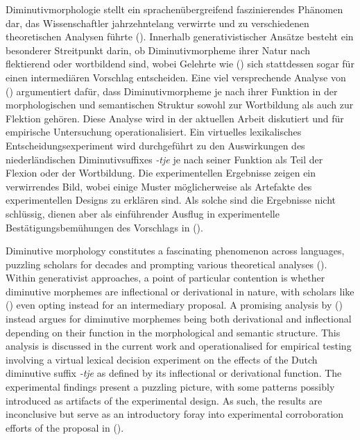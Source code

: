 \begin{abstractDE}
Diminutivmorphologie stellt ein sprachenübergreifend faszinierendes Phänomen dar, das Wissenschaftler jahrzehntelang verwirrte und zu verschiedenen theoretischen Analysen führte (\cite{Schneider+2003}). Innerhalb generativistischer Ansätze besteht ein besonderer Streitpunkt darin, ob Diminutivmorpheme ihrer Natur nach flektierend oder wortbildend sind, wobei Gelehrte wie \citeauthor{Scalise+1986} (\citeyear{Scalise+1986}) sich stattdessen sogar für einen intermediären Vorschlag entscheiden. Eine viel versprechende Analyse von \citeauthor{DeBelder+etal+2014} (\citeyear{DeBelder+etal+2014}) argumentiert dafür, dass Diminutivmorpheme je nach ihrer Funktion in der morphologischen und semantischen Struktur sowohl zur Wortbildung als auch zur Flektion gehören. Diese Analyse wird in der aktuellen Arbeit diskutiert und für empirische Untersuchung operationalisiert. Ein virtuelles lexikalisches Entscheidungsexperiment wird durchgeführt zu den Auswirkungen des niederländischen Diminutivsuffixes \textit{-tje} je nach seiner Funktion als Teil der Flexion oder der Wortbildung. Die experimentellen Ergebnisse zeigen ein verwirrendes Bild, wobei einige Muster möglicherweise als Artefakte des experimentellen Designs zu erklären sind. Als solche sind die Ergebnisse nicht schlüssig, dienen aber als einführender Ausflug in experimentelle Bestätigungsbemühungen des Vorschlags in \citeauthor{DeBelder+etal+2014} (\citeyear{DeBelder+etal+2014}).
\end{abstractDE}

\vfill

\begin{abstractEN}
Diminutive morphology constitutes a fascinating phenomenon across languages, puzzling scholars for decades and prompting various theoretical analyses (\cite{Schneider+2003}). Within generativist approaches, a point of particular contention is whether diminutive morphemes are inflectional or derivational in nature, with scholars like \citeauthor{Scalise+1986} (\citeyear{Scalise+1986}) even opting instead for an intermediary proposal. A promising analysis by \citeauthor{DeBelder+etal+2014} (\citeyear{DeBelder+etal+2014}) instead argues for diminutive morphemes being both derivational and inflectional depending on their function in the morphological and semantic structure. This analysis is discussed in the current work and operationalised for empirical testing involving a virtual lexical decision experiment on the effects of the Dutch diminutive suffix \textit{-tje} as defined by its inflectional or derivational function. The experimental findings present a puzzling picture, with some patterns possibly introduced as artifacts of the experimental design. As such, the results are inconclusive but serve as an introductory foray into experimental corroboration efforts of the proposal in \citeauthor{DeBelder+etal+2014} (\citeyear{DeBelder+etal+2014}).
\end{abstractEN}

\vfill